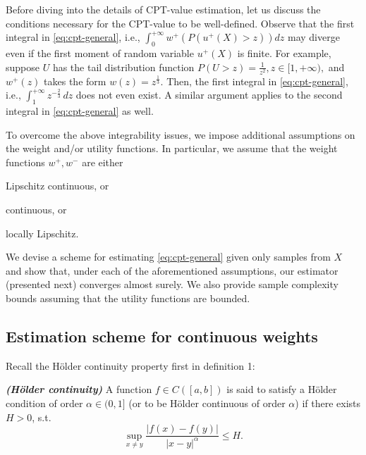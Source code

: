 
Before diving into the details of CPT-value estimation, let us discuss the conditions necessary for the CPT-value to be well-defined.
Observe that the first integral in \eqref{eq:cpt-general}, i.e., 
$\int_0^{+\infty} w^+(P(u^+(X)>z)) d z$
may diverge even if the first moment of random variable $u^+(X)$ is finite. 
For example, suppose $U$ has the tail distribution function
$P(U>z)  = \frac{1}{z^2}, z\in [1, +\infty),$
 and $w^+(z)$ takes the form $w(z) = z^{\frac{1}{3}}$. Then, the first integral in \eqref{eq:cpt-general}, i.e.,
$
\int_1^{+\infty}  z^{-\frac{2}{3}}\, dz
$
does not even exist. A similar argument applies to the second integral in \eqref{eq:cpt-general} as well.

To overcome the above integrability issues, we impose additional  assumptions on the weight and/or utility functions. In particular, we assume that the weight functions $w^+, w^-$ are either 
\begin{inparaenum}[\it (i)]
\item Lipschitz continuous, or
\item \holder continuous, or
\item locally Lipschitz.
\end{inparaenum}
We devise a scheme for estimating \eqref{eq:cpt-general} given only samples from $X$ and show that, under each of the aforementioned assumptions, our estimator (presented next) converges almost surely. 
We also provide sample complexity bounds assuming that the utility functions are bounded.

\subsection{Estimation scheme for \holder continuous weights}
Recall the H\"{o}lder continuity property first in definition 1:
\begin{definition}\label{holder}
{\textbf{\textit{(H\"{o}lder continuity)}}}
A function $f \in C([a,b])$ is said to satisfy
a H\"{o}lder condition of order $\alpha\in (0,1]$ (or to be H\"{o}lder continuous
of order $\alpha$) if there exists $ H>0$, s.t.
\[
\sup_{x \neq y} \frac{| f(x) - f(y) |}{| x-y |^{\alpha}} \leq H .
\]
\end{definition}

